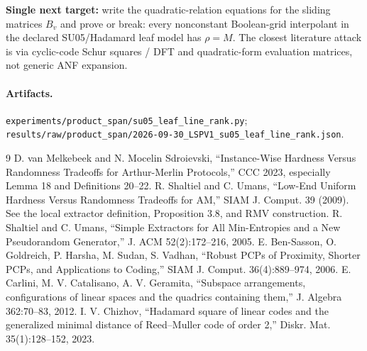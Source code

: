 \documentclass[11pt]{article}
\begin{document}
\textbf{Single next target:} write the quadratic-relation equations for the sliding matrices $B_v$ and prove or break: every nonconstant Boolean-grid interpolant in the declared SU05/Hadamard leaf model has $\rho=M$. The closest literature attack is via cyclic-code Schur squares / DFT and quadratic-form evaluation matrices, not generic ANF expansion.

\paragraph{Artifacts.}
\texttt{experiments/product\_span/su05\_leaf\_line\_rank.py};
\texttt{results/raw/product\_span/2026-09-30\_LSPV1\_su05\_leaf\_line\_rank.json}.

\begin{thebibliography}{9}
 D. van Melkebeek and N. Mocelin Sdroievski, ``Instance-Wise Hardness Versus Randomness Tradeoffs for Arthur-Merlin Protocols,'' CCC 2023, especially Lemma 18 and Definitions 20--22.
 R. Shaltiel and C. Umans, ``Low-End Uniform Hardness Versus Randomness Tradeoffs for AM,'' SIAM J. Comput. 39 (2009). See the local extractor definition, Proposition 3.8, and RMV construction.
 R. Shaltiel and C. Umans, ``Simple Extractors for All Min-Entropies and a New Pseudorandom Generator,'' J. ACM 52(2):172--216, 2005.
 E. Ben-Sasson, O. Goldreich, P. Harsha, M. Sudan, S. Vadhan, ``Robust PCPs of Proximity, Shorter PCPs, and Applications to Coding,'' SIAM J. Comput. 36(4):889--974, 2006.
 E. Carlini, M. V. Catalisano, A. V. Geramita, ``Subspace arrangements, configurations of linear spaces and the quadrics containing them,'' J. Algebra 362:70--83, 2012.
 I. V. Chizhov, ``Hadamard square of linear codes and the generalized minimal distance of Reed--Muller code of order 2,'' Diskr. Mat. 35(1):128--152, 2023.
\end{thebibliography}
\end{document}
